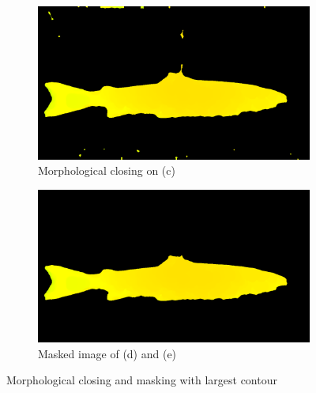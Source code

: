 \begin{figure}[H]
    \medskip
    \begin{subfigure}{0.49\textwidth}
        \includegraphics[width=\linewidth]{images/implementation/5_closing_on_color_filtered_image}
        \caption{Morphological closing on (c)} 
        \label{fig:morphological_closing}
    \end{subfigure}\hspace*{\fill}
    \begin{subfigure}{0.49\textwidth}
        \includegraphics[width=\linewidth]{images/implementation/6_masked_source}
        \caption{Masked image of (d) and (e)} 
        \label{fig:masked_source}
    \end{subfigure}
    \caption{Morphological closing and masking with largest contour} 
    \label{fig:algorithm}
\end{figure}



